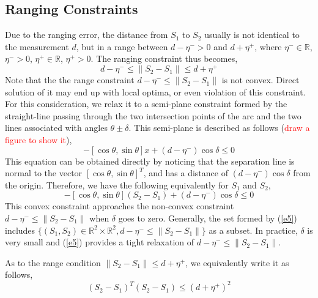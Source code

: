 \documentclass[journal]{IEEEtran}
\begin{document}
\subsection{Ranging Constraints}
Due to the ranging error,  the distance from $S_1$ to $S_2$ usually is not identical to the measurement $d$, but in a range between $d-\eta^->0$ and $d+\eta^+$, where $\eta^-\in\mathbb{R}$, $\eta^->0$, $\eta^+\in\mathbb{R}$, $\eta^+>0$. The ranging constraint thus becomes,
\begin{equation}\label{e3}
d-\eta^-\leq \|S_2-S_1\|\leq d+\eta^+
\end{equation}
Note that the the range constraint $d-\eta^-\leq \|S_2-S_1\|$ is not convex. Direct solution of it may end up with local optima, or even violation of this constraint. For this consideration, we relax it to a semi-plane constraint formed by the straight-line passing through the two intersection points of the arc and the two lines associated with angles $\theta\pm\delta$. This semi-plane is described as follows  (\textcolor{red}{draw a figure to show it}),
\begin{equation}\label{e4}
-[\cos\theta, \sin\theta]x+(d-\eta^-)\cos\delta\leq 0
\end{equation}
This equation can be obtained directly by noticing that the separation line is normal to the vector $[\cos\theta, \sin\theta]^T$, and has a distance of $(d-\eta^-)\cos\delta$ from the origin. Therefore, we have the following equivalently for $S_1$ and $S_2$,
\begin{equation}\label{e5}
-[\cos\theta, \sin\theta](S_2-S_1)+(d-\eta^-)\cos\delta\leq 0
\end{equation}
This convex constraint approaches the non-convex constraint $d-\eta^-\leq\|S_2-S_1\|$ when $\delta$ goes to zero. Generally, the set formed by (\ref{e5}) includes $\{(S_1, S_2)\in\mathbb{R}^2\times \mathbb{R}^2, d-\eta^-\leq\|S_2-S_1\|\}$ as a subset. In practice, $\delta$ is very small and (\ref{e5}) provides a tight relaxation of $d-\eta^-\leq\|S_2-S_1\|$.

As to the range condition $\|S_2-S_1\|\leq d+\eta^+$, we equivalently write it as follows,
\begin{equation}\label{e6}
(S_2-S_1)^T(S_2-S_1) \leq (d+\eta^+)^2
\end{equation}
\end{document}
